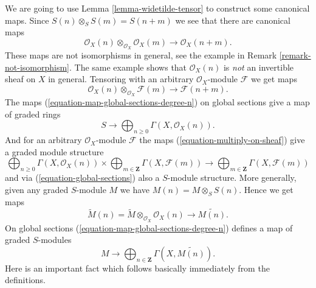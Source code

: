 \noindent
We are going to use Lemma \ref{lemma-widetilde-tensor}
to construct some canonical maps.
Since $S(n) \otimes_S S(m) = S(n + m)$ we see that there
are canonical maps
\begin{equation}
\label{equation-multiply}
\mathcal{O}_X(n) \otimes_{\mathcal{O}_X} \mathcal{O}_X(m)
\longrightarrow
\mathcal{O}_X(n + m).
\end{equation}
These maps are not isomorphisms in general, see the example in
Remark \ref{remark-not-isomorphism}. The same example shows
that $\mathcal{O}_X(n)$ is {\it not} an invertible sheaf on $X$ in
general. Tensoring with an arbitrary $\mathcal{O}_X$-module $\mathcal{F}$
we get maps
\begin{equation}
\label{equation-multiply-on-sheaf}
\mathcal{O}_X(n) \otimes_{\mathcal{O}_X} \mathcal{F}(m)
\longrightarrow
\mathcal{F}(n + m).
\end{equation}
The maps (\ref{equation-map-global-sections-degree-n})
on global sections give a map of graded rings
\begin{equation}
\label{equation-global-sections}
S \longrightarrow \bigoplus\nolimits_{n \geq 0} \Gamma(X, \mathcal{O}_X(n)).
\end{equation}
And for an arbitrary $\mathcal{O}_X$-module $\mathcal{F}$ the maps
(\ref{equation-multiply-on-sheaf}) give a graded module structure
\begin{equation}
\label{equation-global-sections-module}
\bigoplus\nolimits_{n \geq 0} \Gamma(X, \mathcal{O}_X(n))
\times
\bigoplus\nolimits_{m \in \mathbf{Z}} \Gamma(X, \mathcal{F}(m))
\longrightarrow
\bigoplus\nolimits_{m \in \mathbf{Z}} \Gamma(X, \mathcal{F}(m))
\end{equation}
and via (\ref{equation-global-sections}) also a $S$-module structure.
More generally, given any graded $S$-module
$M$ we have $M(n) = M \otimes_S S(n)$. Hence we get maps
\begin{equation}
\label{equation-multiply-more-generally}
\widetilde M(n)
=
\widetilde M
\otimes_{\mathcal{O}_X}
\mathcal{O}_X(n)
\longrightarrow
\widetilde{M(n)}.
\end{equation}
On global sections (\ref{equation-map-global-sections-degree-n})
defines a map of graded $S$-modules
\begin{equation}
\label{equation-global-sections-more-generally}
M \longrightarrow
\bigoplus\nolimits_{n \in \mathbf{Z}} \Gamma(X, \widetilde{M(n)}).
\end{equation}
Here is an important fact which follows basically immediately from the
definitions.

